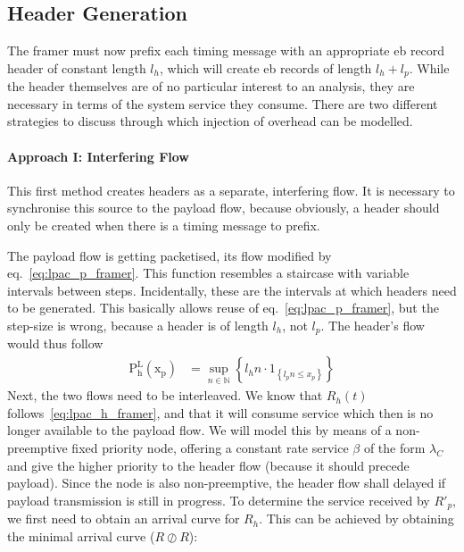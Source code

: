 \subsection{Header Generation}
\label{ssec:ebmf_hg}
The framer must now prefix each timing message with an appropriate \gls{eb} record header of constant length $l_{h}$,
which will create \gls{eb} records of length $l_{h} + l_{p}$. While the header themselves are of no particular interest to an analysis,
they are necessary in terms of the system service they consume. There are two different strategies to discuss through which injection
of overhead can be modelled.

\iffalse
\paragraph{Approach I: Interfering Flow}
This first method creates headers as a separate, interfering flow. It is necessary to synchronise this source to the payload flow, because obviously,
a header should only be created when there is a timing message to prefix. 
\par
The payload flow is getting packetised, its flow modified by eq.~\ref{eq:lpac_p_framer}. This function resembles a staircase with variable
intervals between steps. Incidentally, these are the intervals at which headers need to be generated. 
This basically allows reuse of eq.~\ref{eq:lpac_p_framer}, but the step-size is wrong, because a header is of length $l_h$, not $l_p$.
The header's flow would thus follow
%
\begin{align}
\mathrm{P^L_{h}(x_p)} &= \sup_{n \in \mathbb{N}}\left\{ l_h n \cdot 1_{\left\{l_p n\le x_p\right\}}\right\}
\label{eq:lpac_h_framer}
\end{align}
%
Next, the two flows need to be interleaved. We know that $R_h(t)$ follows~\ref{eq:lpac_h_framer}, and that it will consume service which then is no longer
available to the payload flow. We will model this by means of a non-preemptive fixed priority node, offering a constant rate service $\beta$ of the form $\lambda_C$ and give the higher priority to the header flow (because it should
precede payload). Since the node is also non-preemptive, the header flow shall delayed if payload transmission is still in progress. 
To determine the service received by $R'_p$, we first need to obtain an arrival curve for $R_h$. This can be achieved by obtaining the minimal arrival curve ($R \oslash R$):
